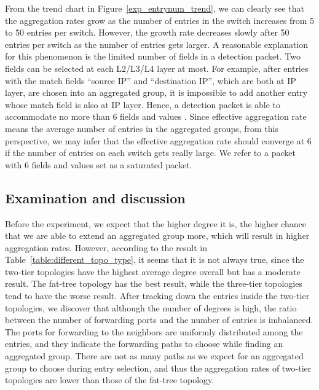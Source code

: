 From the trend chart in Figure~\ref{exp_entrynum_trend}, we can clearly see that the aggregation rates grow as the number of entries in the switch increases from 5 to 50 entries per switch. However, the growth rate decreases slowly after 50 entries per switch as the number of entries gets larger. A reasonable explanation for this phenomenon is the limited number of fields in a detection packet. Two fields can be selected at each L2/L3/L4 layer at most. For example, after entries with the match fields ``source IP'' and ``destination IP'', which are both at IP layer, are chosen into an aggregated group, it is impossible to add another entry whose match field is also at IP layer. Hence, a detection packet is able to accommodate no more than 6 fields and values \sout{}. \sout{} Since effective aggregation rate means the average number of entries in the aggregated groups, from this perspective, we may infer that the effective aggregation rate should converge at 6 if the number of entries on each switch gets really large. We refer to a packet with 6 fields and values set as a saturated packet.


\subsection{Examination and discussion}
\label{examination_and_discussion}

Before the experiment, we expect that the higher degree it is, the higher chance that we are able to extend an aggregated group more, which will result in higher aggregation rates. However, according to the result in Table~\ref{table:different_topo_type}, it seems that it is not always true, since the two-tier topologies have the highest average degree overall but has a moderate result. The fat-tree topology has the best result, while the three-tier topologies tend to have the worse result. After tracking down the entries inside the two-tier topologies, we discover that although the number of degrees is high, the ratio between the number of forwarding ports and the number of entries is imbalanced. The ports for forwarding to the neighbors are uniformly distributed among the entries, and they indicate the forwarding paths to choose while finding an aggregated group. There are not as many paths as we expect for an aggregated group to choose during entry selection, and thus the aggregation rates of two-tier topologies are lower than those of the fat-tree topology. 

